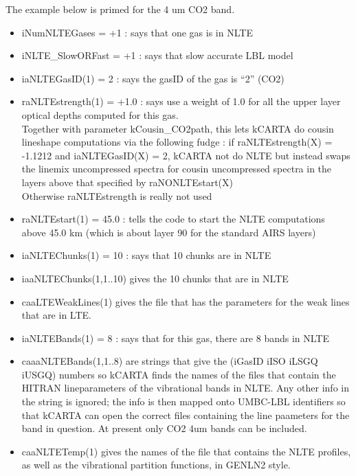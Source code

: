 \documentclass[12pt]{article}
\begin{document}
{{The example below is primed for the 4 um CO2 band. \\
\begin{itemize}
\item iNumNLTEGases = +1 : says that one gas is in NLTE
\item iNLTE\_SlowORFast = +1 : says that slow accurate LBL model
\item  iaNLTEGasID(1)    = 2 : says the gasID of the gas is ``2'' (CO2)
\item  raNLTEstrength(1) = +1.0 : says use a weight of 1.0 for all the
                          upper layer optical depths computed for this gas.\\
                          Together with parameter kCousin\_CO2path, this lets 
                          kCARTA do cousin lineshape computations via the
                          following fudge : if raNLTEstrength(X) = -1.1212 and
                          iaNLTEGasID(X) = 2, kCARTA not do NLTE but instead 
                          swaps the linemix uncompressed spectra for cousin 
                          uncompressed spectra in the layers above that 
                          specified by raNONLTEstart(X)\\
                          Otherwise raNLTEstrength is really not used
\item  raNLTEstart(1)   =  45.0 : tells the code to start the NLTE 
                     computations above 45.0 km (which is about layer 90 for 
                     the standard AIRS layers)
\item iaNLTEChunks(1) = 10 : says that 10 chunks are in NLTE
\item iaaNLTEChunks(1,1..10) gives the 10 chunks that are in NLTE
\item caaLTEWeakLines(1) gives the file that has the parameters for the
            weak lines that are in LTE.
\item iaNLTEBands(1) = 8 : says that for this gas, there are 8 bands in NLTE
\item caaaNLTEBands(1,1..8) are strings that give the (iGasID iISO iLSGQ iUSGQ)
      numbers so kCARTA finds the names of the files that contain the
      HITRAN lineparameters of the vibrational bands in NLTE. Any other info
      in the string is ignored; the info is then mapped onto UMBC-LBL 
      identifiers so that kCARTA can open the correct files containing the 
      line paameters for the band in question. At present only CO2 4um bands
      can be included.
\item caaNLTETemp(1) gives the names of the file that contains the
       NLTE profiles, as well as the vibrational partition functions, in GENLN2
       style.
\end{itemize}

}}
\end{document}
